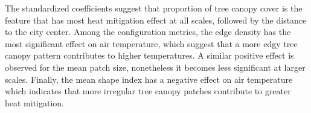 \documentclass[12pt]{iopart}
\begin{document}
The standardized coefficients suggest that proportion of tree canopy cover is the feature that has most heat mitigation effect at all scales, followed by the distance to the city center. Among the configuration metrics, the edge density has the most significant effect on air temperature, which suggest that a more edgy tree canopy pattern contributes to higher temperatures. A similar positive effect is observed for the mean patch size, nonetheless it becomes less significant at larger scales. Finally, the mean shape index has a negative effect on air temperature which indicates that more irregular tree canopy patches contribute to greater heat mitigation.

\end{document}
